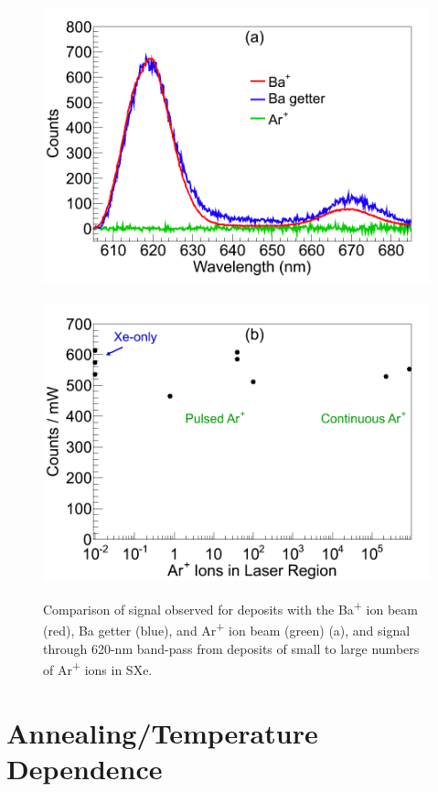 \begin{figure} %
        \centering
                \includegraphics[width=.5\textwidth]{figures/Ar_vs_Ba.png}
                ~
                \includegraphics[width=.5\textwidth]{figures/ArImaging.png}
                \caption{Comparison of signal observed for deposits with the Ba\textsuperscript{+} ion beam (red), Ba getter (blue), and Ar\textsuperscript{+} ion beam (green) (a), and signal through 620-nm band-pass from deposits of small to large numbers of Ar\textsuperscript{+} ions in SXe.}
\label{fig:ArVsBa}
\end{figure}


\section{Annealing/Temperature Dependence}
\label{sec:tempanneal}


